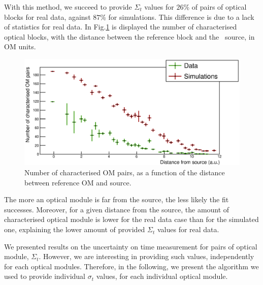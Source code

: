 With this method, we succeed to provide $\Sigma_{t}$ values for $26$\% of pairs of optical blocks for real data, against $87$\% for simulations.
This difference is due to a lack of statistics for real data.
In Fig.\ref{fig:Co_sigma_distance} is displayed the number of characterised optical blocks, with the distance between the reference block and the \Co\ source, in OM units.
\begin{figure}[h]
  \centering
  \includegraphics[width=15cm]{commissioning/fig_commissioning/Co_sigma_distance.eps}
  \caption{Number of characterised OM pairs, as a function of the distance between reference OM and source.
    \label{fig:Co_sigma_distance}}
\end{figure}
The more an optical module is far from the source, the less likely the fit successes.
Moreover, for a given distance from the source, the amount of characterised optical module is lower for the real data case than for the simulated one, explaining the lower amount of provided $\Sigma_{t}$ values for real data.





We presented results on the uncertainty on time measurement for pairs of optical module, $\Sigma_{t}$.
However, we are interesting in providing such values, independently for each optical modules.
Therefore, in the following, we present the algorithm we used to provide individual $\sigma_{t}$ values, for each individual optical module.



